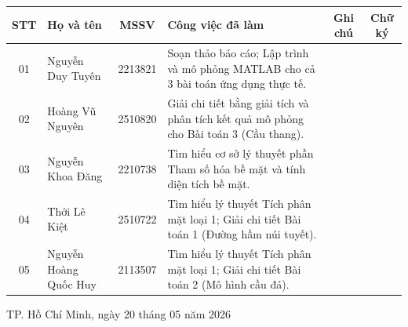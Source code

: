 \begin{center}
	\footnotesize 
	\renewcommand{\arraystretch}{1.2} %
	
	\begin{tabularx}{\textwidth}{c l c X c c} 
		\toprule
		\textbf{STT} & \textbf{Họ và tên} & \textbf{MSSV} & \textbf{Công việc đã làm} & \textbf{Ghi chú} & \textbf{Chữ ký} \\
		\midrule
		01 & Nguyễn Duy Tuyên & 2213821 & Soạn thảo báo cáo; Lập trình và mô phỏng MATLAB cho cả 3 bài toán ứng dụng thực tế. & & \\[0.3cm] %
		02 & Hoàng Vũ Nguyên & 2510820 & Giải chi tiết bằng giải tích và phân tích kết quả mô phỏng cho Bài toán 3 (Cầu thang). & & \\[0.3cm]
		03 & Nguyễn Khoa Đăng & 2210738 & Tìm hiểu cơ sở lý thuyết phần Tham số hóa bề mặt và tính diện tích bề mặt. & & \\[0.3cm]
		04 & Thới Lê Kiệt & 2510722 & Tìm hiểu lý thuyết Tích phân mặt loại 1; Giải chi tiết Bài toán 1 (Đường hầm núi tuyết). & & \\[0.3cm]
		05 & Nguyễn Hoàng Quốc Huy & 2113507 & Tìm hiểu lý thuyết Tích phân mặt loại 1; Giải chi tiết Bài toán 2 (Mô hình cầu đá). & & \\
		\bottomrule
	\end{tabularx}
\end{center}

\vspace{0.2cm} %
\begin{center}
	\small TP. Hồ Chí Minh, ngày 20 tháng 05 năm 2026
\end{center}
\clearpage